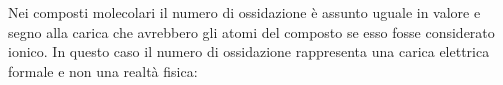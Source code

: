 


Nei composti molecolari il numero di ossidazione è assunto uguale in valore e segno alla carica che avrebbero gli atomi del composto se esso fosse considerato ionico.
In questo caso il numero di ossidazione rappresenta una carica elettrica
formale e non una realtà fisica:


